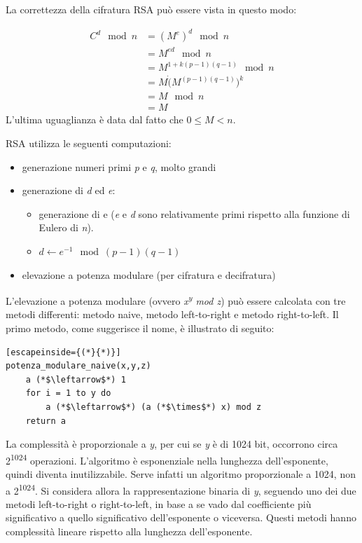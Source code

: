 La correttezza della cifratura RSA può essere vista in questo modo:

\begin{equation}
\begin{split}
C^{d} \mod n & = (M^{e})^{d} \mod n\\
 & = M^{ed} \mod n\\
 & = M^{1+k(p-1)(q-1)} \mod n\\
 & = M \dot (M^{(p-1)(q-1)})^{k}\\
 & = M \mod n\\
 & = M
\end{split}
\end{equation}
L'ultima uguaglianza è data dal fatto che $0\leq M < n$. 

RSA utilizza le seguenti computazioni:
\begin{itemize}
    \item generazione numeri primi \textit{p} e \textit{q}, molto grandi
    \item generazione di \textit{d} ed \textit{e}:
    \begin{itemize}
        \item generazione di e (\textit{e} e \textit{d} sono relativamente primi rispetto alla funzione di Eulero di \textit{n}).
        \item $d \leftarrow e^{-1} \mod (p-1)(q-1)$
    \end{itemize}
    \item elevazione a potenza modulare (per cifratura e decifratura)
\end{itemize}
L'elevazione a potenza modulare (ovvero \textit{x\textsuperscript{y} mod z}) può essere calcolata con tre metodi differenti: metodo naive, metodo left-to-right e metodo right-to-left.
Il primo metodo, come suggerisce il nome, è illustrato di seguito:
\begin{lstlisting}[escapeinside={(*}{*)}]
potenza_modulare_naive(x,y,z)
    a (*$\leftarrow$*) 1
    for i = 1 to y do
        a (*$\leftarrow$*) (a (*$\times$*) x) mod z
    return a
\end{lstlisting}
La complessità è proporzionale a \textit{y}, per cui se \textit{y} è di 1024 bit, occorrono circa 2\textsuperscript{1024} operazioni. L'algoritmo è esponenziale nella lunghezza dell'esponente, quindi diventa inutilizzabile. Serve infatti un algoritmo proporzionale a 1024, non a 2\textsuperscript{1024}. Si considera allora la rappresentazione binaria di \textit{y}, seguendo uno dei due metodi left-to-right o right-to-left, in base a se vado dal coefficiente più significativo a quello significativo dell'esponente o viceversa. Questi metodi hanno complessità lineare rispetto alla lunghezza dell'esponente.

